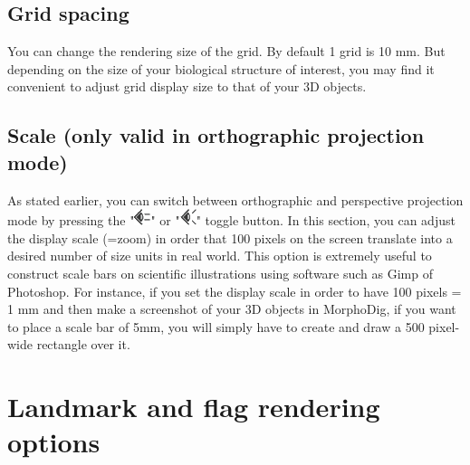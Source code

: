 \subsection{Grid spacing}
\noindent You can change the rendering size of the grid. By default 1 grid is 10 mm. But depending on the size of your biological structure of interest, you may find it convenient to adjust grid display size to that of your 3D objects. 

\subsection{Scale (only valid in orthographic projection mode)}
\noindent As stated earlier, you can switch between orthographic and perspective projection mode by pressing the "\includegraphics[scale=0.7]{images/06/camera/camera_ortho.png}" or "\includegraphics[scale=0.7]{images/06/camera/camera_persp}" toggle button. In this section, you can adjust the display scale (=zoom) in order that 100 pixels on the screen translate into a desired number of size units in real world. This option is extremely useful to construct scale bars on scientific illustrations using software such as Gimp of Photoshop. For instance, if you set the display scale in order to have 100 pixels = 1 mm and then make a screenshot of your 3D objects in MorphoDig, if you want to place a scale bar of 5mm, you will simply have to create and draw a 500 pixel-wide rectangle over it. 




\noindent



\section{Landmark and flag rendering options}


